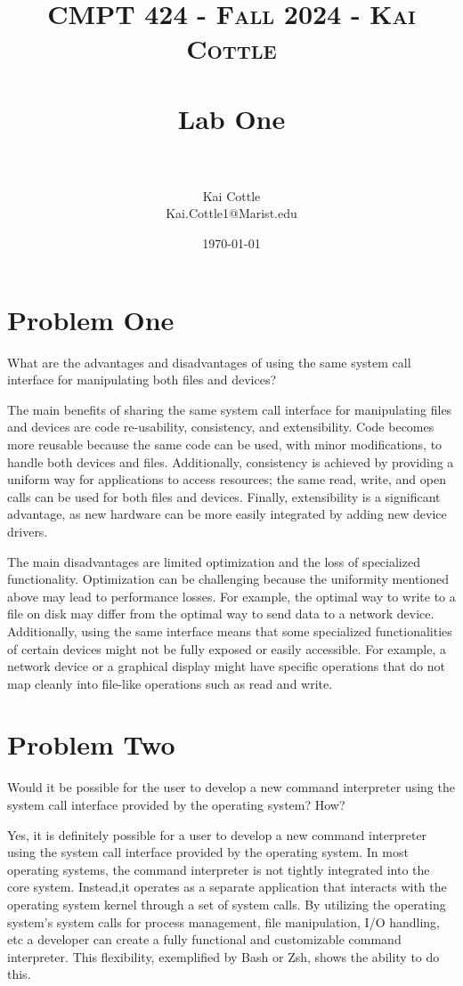 \documentclass[letterpaper, 10pt,DIV=13]{scrartcl}
\title{	
   \normalfont \normalsize 
   \textsc{CMPT 424 - Fall 2024 - Kai Cottle} \\[10pt] %
   \horrule{0.5pt} \\[0.25cm] 	%
   \huge Lab One  \\     	    %
   \horrule{0.5pt} \\[0.25cm] 	%
}
\author{Kai Cottle \\ \normalsize Kai.Cottle1@Marist.edu}
\date{\normalsize\today} 	%
\numberwithin{equation}{section} %
\numberwithin{figure}{section} %
\numberwithin{table}{section} %
\begin{document}
\maketitle %

\section{Problem One}
What are the advantages and disadvantages of using the same system call interface for manipulating both files and devices?

    The main benefits of sharing the same system call interface for manipulating files and devices are code re-usability, consistency, and extensibility. Code becomes more reusable because the same code can be used, with minor modifications, to handle both devices and files. Additionally, consistency is achieved by providing a uniform way for applications to access resources; the same read, write, and open calls can be used for both files and devices. Finally, extensibility is a significant advantage, as new hardware can be more easily integrated by adding new device drivers.

    The main disadvantages are limited optimization and the loss of specialized functionality. Optimization can be challenging because the uniformity mentioned above may lead to performance losses. For example, the optimal way to write to a file on disk may differ from the optimal way to send data to a network device. Additionally, using the same interface means that some specialized functionalities of certain devices might not be fully exposed or easily accessible. For example, a network device or a graphical display might have specific operations that do not map cleanly into file-like operations such as read and write.

\section{Problem Two}
Would it be possible for the user to develop a new command interpreter using the system call interface provided by the operating system? How?

    Yes, it is definitely possible for a user to develop a new command interpreter using the system call interface provided by the operating system. In most operating systems, the command interpreter is not tightly integrated into the core system. Instead,it operates as a separate application that interacts with the operating system kernel through a set of system calls. By utilizing the operating system's system calls for process management, file manipulation, I/O handling, etc a developer can create a fully functional and customizable command interpreter. This flexibility, exemplified by Bash or Zsh, shows the ability to do this. 
\end{document}
